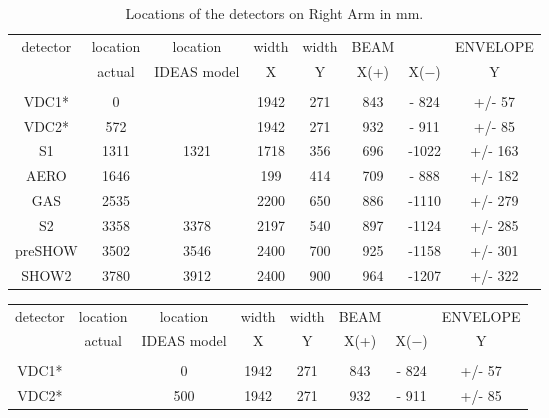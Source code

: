 {\begin{table}[hptb]
\begin{center}
\begin{tabular}{cccccccc}
detector&location&  location& width &   width &      BEAM  &        & ENVELOPE \\
        & actual &IDEAS model&   X  &     Y   &      X(+)&  X($-$) &   Y\\  \hline
       &        &          &        &         &          &         &           \\  \hline    
VDC1*   &      0 &          &   1942 &    271  &     843    & - 824  & +/-  57  \\
VDC2*   &     572&          &   1942 &    271  &     932    & - 911  & +/-  85  \\
S1      &    1311&     1321 &   1718 &    356  &     696    & -1022  & +/- 163  \\ 
AERO    &    1646&          &   199  &    414  &     709    & - 888  & +/- 182  \\
GAS     &    2535&          &   2200 &    650  &     886    & -1110  & +/- 279  \\ 
S2      &    3358&     3378 &   2197 &    540  &     897    & -1124  & +/- 285  \\
preSHOW &    3502&     3546 &   2400 &    700  &     925    & -1158  & +/- 301  \\ 
SHOW2   &    3780&     3912 &   2400 &    900  &     964    & -1207  & +/- 322  \\  \hline
\end{tabular}
\end{center}
\caption[Detectors: Right ARM Detector Locations]{Locations of
the detectors on Right Arm in mm.}
\label{ta:Rdetg}
\end{table}
\begin{table}[hptb]
\begin{center}
\begin{tabular}{cccccccc}
detector&location&  location& width &   width &      BEAM  &        & ENVELOPE \\
        & actual &IDEAS model&   X  &     Y   &      X(+)&  X($-$) &   Y\\  \hline
       &        &          &        &         &          &         &           \\  \hline    
VDC1*  &        &         0&    1942&     271 &     843  &  - 824  &  +/-  57  \\    
VDC2*  &        &       500&    1942&     271 &     932  &  - 911  &  +/-  85  \\ 

\end{tabular}
\end{center}
\end{table}}
